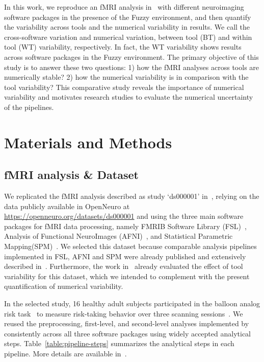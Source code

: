 \documentclass[conference]{IEEEtran}
\begin{document}
In this work, we reproduce an fMRI analysis in~\cite{bowring2019exploring} with different neuroimaging software packages in the presence of the Fuzzy environment,
and then quantify the variability across tools and the numerical variability in results.
We call the cross-software variation and numerical variation, between tool (BT) and within tool (WT) variability, respectively.
In fact, the WT variability shows results across software packages in the Fuzzy environment.
The primary objective of this study is to answer these two questions: 1) how the fMRI analyses across tools are numerically stable?
2) how the numerical variability is in comparison with the tool variability?
This comparative study reveals the importance of numerical variability and motivates research studies to evaluate the numerical uncertainty of the pipelines.



\section{Materials and Methods}

\subsection{fMRI analysis \& Dataset}

We replicated the fMRI analysis described as study `ds000001'
in~\cite{schonberg2012decreasing}, relying on the
data publicly available in OpenNeuro at
\url{https://openneuro.org/datasets/ds000001} and using the three main
software packages for fMRI data processing, namely FMRIB Software Library
(FSL)~\cite{jenkinson2012fsl}, Analysis of Functional NeuroImages
(AFNI)~\cite{cox1996afni}, and Statistical Parametric
Mapping(SPM)~\cite{penny2011statistical}. We selected this dataset because
comparable analysis pipelines implemented in FSL, AFNI and SPM 
were already published and extensively described in~\cite{bowring2019exploring}.
Furthermore, the work in~\cite{bowring2019exploring} already evaluated the effect of tool variability for
this dataset, which we intended to complement with the present quantification of numerical variability.

In the selected study, 16 healthy adult subjects participated in the
balloon analog risk task~\cite{lejuez2002evaluation} to measure
risk-taking behavior over three scanning sessions~\cite{schonberg2012decreasing}.
We reused the preprocessing, first-level, and
second-level analyses implemented by~\cite{bowring2019exploring} consistently across all three software packages using 
widely accepted analytical steps. Table~\ref{table:pipeline-steps} summarizes the analytical steps in each pipeline.
More details are available in~\cite{bowring2019exploring}.
\end{document}
